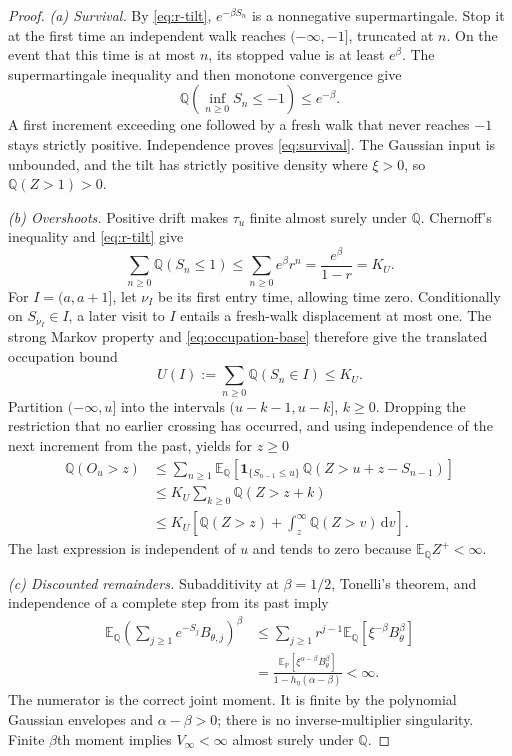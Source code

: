 \documentclass[11pt,a4paper]{article}
\numberwithin{equation}{section}
\theoremstyle{remark}
\newcommand{\E}{\mathbb E}
\newcommand{\Pp}{\mathbb P}
\newcommand{\Q}{\mathbb Q}
\newcommand{\ind}{\mathbf 1}
\newcommand{\dd}{\,\mathrm d}
\begin{document}
\begin{proof}
\emph{(a) Survival.} By \eqref{eq:r-tilt}, $e^{-\beta S_n}$ is a
nonnegative supermartingale. Stop it at the first time an independent
walk reaches $(-\infty,-1]$, truncated at $n$. On the event that this
time is at most $n$, its stopped value is at least $e^\beta$.
The supermartingale inequality and then monotone convergence give
\begin{equation}
 \Q\!\left(\inf_{n\ge0}S_n\le-1\right)\le e^{-\beta}.
 \label{eq:survival-ruin}
\end{equation}
A first increment exceeding one followed by a fresh walk that never
reaches $-1$ stays strictly positive. Independence proves
\eqref{eq:survival}. The Gaussian input is unbounded, and the tilt has
strictly positive density where $\xi>0$, so $\Q(Z>1)>0$.

\emph{(b) Overshoots.} Positive drift makes $\tau_u$ finite almost surely
under $\Q$. Chernoff's inequality and \eqref{eq:r-tilt} give
\begin{equation}
 \sum_{n\ge0}\Q(S_n\le1)
 \le\sum_{n\ge0}e^\beta r^n
 =\frac{e^\beta}{1-r}=K_U.\label{eq:occupation-base}
\end{equation}
For $I=(a,a+1]$, let $\nu_I$ be its first entry time, allowing time zero.
Conditionally on $S_{\nu_I}\in I$, a later visit to $I$ entails a
fresh-walk displacement at most one. The strong Markov property and
\eqref{eq:occupation-base} therefore give the translated occupation bound
\begin{equation}
 U(I):=\sum_{n\ge0}\Q(S_n\in I)\le K_U.\label{eq:occupation-translated}
\end{equation}
Partition $(-\infty,u]$ into the intervals $(u-k-1,u-k]$, $k\ge0$.
Dropping the restriction that no earlier crossing has occurred, and using
independence of the next increment from the past, yields for $z\ge0$
\begin{align}
 \Q(O_u>z)
 &\le\sum_{n\ge1}\E_\Q\!
  \left[\ind_{\{S_{n-1}\le u\}}\,
        \Q(Z>u+z-S_{n-1})\right]\nonumber\\
 &\le K_U\sum_{k\ge0}\Q(Z>z+k)\nonumber\\
 &\le K_U\left[\Q(Z>z)+\int_z^\infty\Q(Z>v)\dd v\right].
 \label{eq:overshoot-proof}
\end{align}
The last expression is independent of $u$ and tends to zero because
$\E_\Q Z^+<\infty$.

\emph{(c) Discounted remainders.} Subadditivity at $\beta=1/2$, Tonelli's
theorem, and independence of a complete step from its past imply
\begin{align}
 \E_\Q\left(\sum_{j\ge1}e^{-S_j}B_{\theta,j}\right)^\beta
 &\le\sum_{j\ge1}r^{j-1}\E_\Q[\xi^{-\beta}B_\theta^\beta]\nonumber\\
 &=\frac{\E_\Pp[\xi^{\alpha-\beta}B_\theta^\beta]}
              {1-h_\eta(\alpha-\beta)}<\infty.
 \label{eq:discounted-proof}
\end{align}
The numerator is the correct joint moment. It is finite by the polynomial
Gaussian envelopes and $\alpha-\beta>0$; there is no inverse-multiplier
singularity. Finite $\beta$th moment implies $V_\infty<\infty$
almost surely under $\Q$.
\end{proof}
\end{document}
